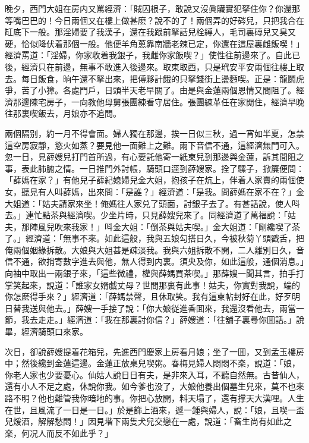 晚夕，西門大姐在房内又罵經濟：「賊囚根子，敢說又沒眞贜實犯拏住你？你還那等嘴巴巴的！今日兩個又在樓上做甚麽？說不的了！兩個弄的好硶兒，只把我合在缸底下一般。那淫婦要了我漢子，還在我跟前拏話兒栓縛人，毛司裏磚兒又臭又硬，恰似降伏着那個一般。他便羊角蔥靠南牆老辣已定，你還在這屋裏雌飯喫！」經濟罵道：「淫婦，你家收着我銀子，我雌你家飯喫？」使性往前邊來了。自此已後，經濟只在前邊，無事不敢進入後邊來。取東取西，只是玳安平安兩個往樓上取去。每日飯食，晌午還不拏出來，把傅夥計餓的只拏錢街上盪麪喫。正是：龍鬬虎爭，苦了小獐。各處門戶，日頭半天老早關了。由是與金蓮兩個恩情又間阻了。經濟那邊陳宅房子，一向教他母舅張團練看守居住。張團練革任在家閒住，經濟早晚往那裏喫飯去，月娘亦不追問。

兩個隔别，約一月不得會面。婦人獨在那邊，挨一日似三秋，過一宵如半夏，怎禁這空房寂靜，慾火如蒸？要見他一面難上之難。兩下音信不通，這經濟無門可入。忽一日，見薛嫂兒打門首所過，有心要託他寄一紙柬兒到那邊與金蓮，訴其間阻之事，表此肺腑之情。一日推門外討帳，騎頭口逕到薛嫂家。拴了騾子，掀簾便問：「薛媽在家？」有他兒子薛紀媳婦兒金大姐，抱孩子在炕上，伴着人家賣的兩個使女，聽見有人叫薛媽，出來問：「是誰？」經濟道：「是我。問薛媽在家不在？」金大姐道：「姑夫請家來坐！俺媽往人家兑了頭面，討銀子去了。有甚話說，使人呌去。」連忙點茶與經濟喫。少坐片時，只見薛嫂兒來了。同經濟道了萬福說：「姑夫，那陣風兒吹來我家！」呌金大姐：「倒茶與姑夫喫。」金大姐道：「剛纔喫了茶了。」經濟道：「無事不來。如此這般，我與五娘勾搭日久，今被秋菊丫頭戳舌，把俺兩個姻緣拆散。大娘與大姐甚是疎淡我。我與六姐拆散不開，二人離別日久，音信不通，欲捎寄數字進去與他，無人得到内裏。須央及你，如此這般，通個消息。」向袖中取出一兩銀子來，「這些微禮，權與薛媽買茶喫。」那薛嫂一聞其言，拍手打掌笑起來，說道：「誰家女婿戯丈母？世間那裏有此事！姑夫，你實對我說，端的你怎麽得手來？」經濟道：「薛媽禁聲，且休取笑。我有這柬帖封好在此，好歹明日替我送與他去。」薛嫂一手接了說：「你大娘従進香囬來，我還沒看他去，兩當一節，我去走走。」經濟道：「我在那裏討你信？」薛嫂道：「往舖子裏尋你囬話。」說畢，經濟騎頭口來家。

次日，卻說薛嫂提着花箱兒，先進西門慶家上房看月娘；坐了一囬，又到孟玉樓房中；然後纔到金蓮這邊。金蓮正放桌兒喫粥。春梅見婦人悶悶不楽，說道：「娘，你老人家也少要憂心。仙姑人說日日有夫，是非來入耳，不聽自然無。古昔仙人，還有小人不足之處，休說你我。如今爹也没了，大娘他養出個墓生兒來，莫不也來路不明？他也難管我你暗地的事。你把心放開，料天塌了，還有撑天大漢哩。人生在世，且風流了一日是一日。」於是篩上酒來，遞一鍾與婦人，說：「娘，且喫一盃兒煖酒，解解愁悶！」因見堦下兩隻犬兒交戀在一處，說道：「畜生尚有如此之楽，何况人而反不如此乎？」

